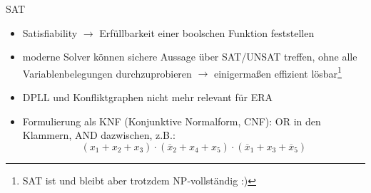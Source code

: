 \documentclass[
  german,            %
  aspectratio=169,    %
]{tumbeamer}
\newcommand{\n}[1]{\overline{#1}}
\begin{document}
\begin{frame}[c]{SAT}{}
	\begin{itemize}
		\item Satisfiability $\rightarrow$ Erfüllbarkeit einer boolschen Funktion feststellen
		\item moderne Solver können sichere Aussage über SAT/UNSAT treffen, ohne alle Variablenbelegungen durchzuprobieren $\rightarrow$ einigermaßen effizient lösbar\footnote{SAT ist und bleibt aber trotzdem NP-vollständig :)}
		\item DPLL und Konfliktgraphen nicht mehr relevant für ERA
		\item Formulierung als KNF (Konjunktive Normalform, CNF): OR in den Klammern, AND dazwischen, z.B.:\[
			      (x_1+x_2+x_3)\cdot(\n{x}_2+x_4+x_5)\cdot(\n{x}_1+x_3+\n{x}_5)\]
	\end{itemize}
\end{frame}
\end{document}

